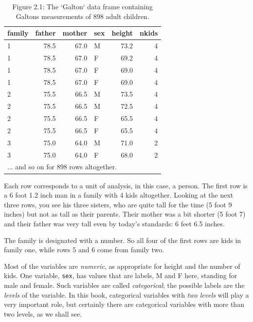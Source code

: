 \documentclass[]{tufte-book}
\begin{document}
\begin{table}

\caption{\label{tab:unnamed-chunk-2}Figure 2.1: The `Galton` data frame containing Galtons measurements of 898 adult children.}
\centering
\begin{tabular}[t]{l|r|r|l|r|r}
\hline
family & father & mother & sex & height & nkids\\
\hline
1 & 78.5 & 67.0 & M & 73.2 & 4\\
\hline
1 & 78.5 & 67.0 & F & 69.2 & 4\\
\hline
1 & 78.5 & 67.0 & F & 69.0 & 4\\
\hline
1 & 78.5 & 67.0 & F & 69.0 & 4\\
\hline
2 & 75.5 & 66.5 & M & 73.5 & 4\\
\hline
2 & 75.5 & 66.5 & M & 72.5 & 4\\
\hline
2 & 75.5 & 66.5 & F & 65.5 & 4\\
\hline
2 & 75.5 & 66.5 & F & 65.5 & 4\\
\hline
3 & 75.0 & 64.0 & M & 71.0 & 2\\
\hline
3 & 75.0 & 64.0 & F & 68.0 & 2\\
\hline
\multicolumn{6}{l}{... and so on for 898 rows altogether.}\\
\end{tabular}
\end{table}

Each row corresponds to a unit of analysis, in this case, a person. The first row is a 6 foot 1.2 inch man in a family with 4 kids altogether. Looking at the next three rows, you see his three sisters, who are quite tall for the time (5 foot 9 inches) but not as tall as their parents. Their mother was a bit shorter (5 foot 7) and their father was very tall even by today's standards: 6 feet 6.5 inches.

The family is designated with a number. So all four of the first rows are kids in family one, while rows 5 and 6 come from family two.

Most of the variables are \emph{numeric}, as appropriate for height and the number of kids. One variable, \texttt{sex}, has values that are labels, M and F here, standing for male and female. Such variables are called \emph{categorical}; the possible labels are the \emph{levels} of the variable. In this book, categorical variables with \emph{two levels} will play a very important role, but certainly there are categorical variables with more than two levels, as we shall see.
\end{document}

